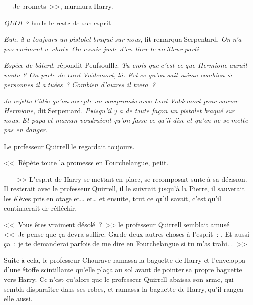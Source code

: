 --- Je promets~>>, murmura Harry.

\emph{QUOI~?} hurla le reste de son esprit.

\emph{Euh, il a toujours un pistolet braqué sur nous}, fit remarqua Serpentard. \emph{On n'a pas vraiment le choix. On essaie juste d'en tirer le meilleur parti.}

\emph{Espèce de bâtard}, répondit Poufsouffle. \emph{Tu crois que c'est ce que Hermione aurait voulu~? On parle de Lord Voldemort, là. Est-ce qu'on sait même combien de personnes il a tuées~? Combien d'autres il tuera~?}

\emph{Je rejette l'idée qu'on accepte un compromis avec Lord Voldemort pour sauver Hermione}, dit Serpentard. \emph{Puisqu'il y a de toute façon un pistolet braqué sur nous. Et papa et maman voudraient qu'on fasse ce qu'il dise et qu'on ne se mette pas en danger.}

Le professeur Quirrell le regardait toujours.

<<~Répète toute la promesse en Fourchelangue, petit.

--- ~>> L'esprit de Harry se mettait en place, se recomposait suite à sa décision. Il resterait avec le professeur Quirrell, il le suivrait jusqu'à la Pierre, il sauverait les élèves pris en otage et… et… et ensuite, tout ce qu'il savait, c'est qu'il continuerait de réfléchir.

<<~Vous êtes vraiment désolé~?~>> le professeur Quirrell semblait amusé. <<~Je pense que ça devra suffire. Garde deux autres choses à l'esprit~: . Et aussi ça~: je te demanderai parfois de me dire en Fourchelangue si tu m'as trahi. .~>>

\later

Suite à cela, le professeur Chourave ramassa la baguette de Harry et l'enveloppa d'une étoffe scintillante qu'elle plaça au sol avant de pointer sa propre baguette vers Harry. Ce n'est qu'alors que le professeur Quirrell abaissa son arme, qui sembla disparaître dans ses robes, et ramassa la baguette de Harry, qu'il rangea elle aussi.

